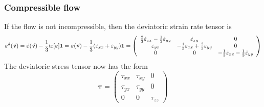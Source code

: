 \subsubsection{Compressible flow}
If the flow is not incompressible, then the deviatoric strain rate tensor is
\[
\dot{\bm \varepsilon}^d(\vec\upnu) 
= \dot{\bm \varepsilon}(\vec\upnu) -\frac{1}{3} {\rm tr}[\dot{\bm \varepsilon}]   {\bm 1} 
= \dot{\bm \varepsilon}(\vec\upnu) -\frac{1}{3} (\dot{\varepsilon}_{xx} +\dot{\varepsilon}_{yy}   )  {\bm 1} 
=
\left(
\begin{array}{ccc}
\frac{2}{3}\dot{\varepsilon}_{xx} -\frac{1}{3}\dot{\varepsilon}_{yy} & \dot{\varepsilon}_{xy} & 0 \\
\dot{\varepsilon}_{yx} & -\frac{1}{3}\dot{\varepsilon}_{xx} +\frac{2}{3} \dot{\varepsilon}_{yy} & 0 \\
0 & 0 & -\frac{1}{3} \dot{\varepsilon}_{xx} -\frac{1}{3}\dot{\varepsilon}_{yy}
\end{array}
\right)
\]
The deviatoric stress tensor now has the form
\[
\bm\tau=
\left(\begin{array}{ccc}
\tau_{xx} & \tau_{xy} & 0 \\
\tau_{yx} & \tau_{yy} & 0 \\
0 & 0 & \tau_{zz}
\end{array}\right)
\]

